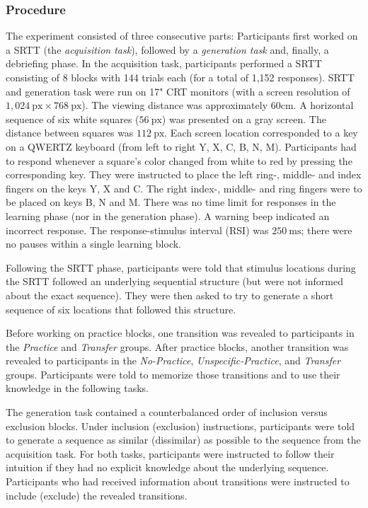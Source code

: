 \documentclass[man]{apa6}
\theoremstyle{definition}
\theoremstyle{definition}
\theoremstyle{definition}
\theoremstyle{remark}
\begin{document}
\subsubsection{Procedure}\label{procedure}

The experiment consisted of three consecutive parts: Participants first
worked on a SRTT (the \emph{acquisition task}), followed by a
\emph{generation task} and, finally, a debriefing phase. In the
acquisition task, participants performed a SRTT consisting of 8 blocks
with 144 trials each (for a total of 1,152 responses). SRTT and
generation task were run on 17" CRT monitors (with a screen resolution
of \(1{,}024~\text{px} \times 768~\text{px}\)). The viewing distance was
approximately 60cm. A horizontal sequence of six white squares
(\(56~\text{px}\)) was presented on a gray screen. The distance between
squares was \(112~\text{px}\). Each screen location corresponded to a
key on a QWERTZ keyboard (from left to right Y, X, C, B, N, M).
Participants had to respond whenever a square's color changed from white
to red by pressing the corresponding key. They were instructed to place
the left ring-, middle- and index fingers on the keys Y, X and C. The
right index-, middle- and ring fingers were to be placed on keys B, N
and M. There was no time limit for responses in the learning phase (nor
in the generation phase). A warning beep indicated an incorrect
response. The response-stimulus interval (RSI) was \(250~\text{ms}\);
there were no pauses within a single learning block.

Following the SRTT phase, participants were told that stimulus locations
during the SRTT followed an underlying sequential structure (but were
not informed about the exact sequence). They were then asked to try to
generate a short sequence of six locations that followed this structure.

Before working on practice blocks, one transition was revealed to
participants in the \emph{Practice} and \emph{Transfer} groups. After
practice blocks, another transition was revealed to participants in the
\emph{No-Practice}, \emph{Unspecific-Practice}, and \emph{Transfer}
groups. Participants were told to memorize those transitions and to use
their knowledge in the following tasks.

The generation task contained a counterbalanced order of inclusion
versus exclusion blocks. Under inclusion (exclusion) instructions,
participants were told to generate a sequence as similar (dissimilar) as
possible to the sequence from the acquisition task. For both tasks,
participants were instructed to follow their intuition if they had no
explicit knowledge about the underlying sequence. Participants who had
received information about transitions were instructed to include
(exclude) the revealed transitions.
\end{document}
